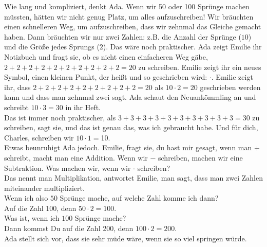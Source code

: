 Wie lang und kompliziert, denkt Ada. 
Wenn wir 50 oder 100 Sprünge machen müssten, hätten wir nicht genug Platz, um alles aufzuschreiben! 
Wir bräuchten einen schnelleren Weg, um aufzuschreiben, dass wir zehnmal das Gleiche gemacht haben. Dann bräuchten wir nur zwei Zahlen: z.B. die Anzahl der Sprünge ($10$) und die Größe jedes Sprungs ($2$). Das wäre noch praktischer. 
Ada zeigt Emilie ihr Notizbuch und fragt sie, ob es nicht einen einfacheren Weg gäbe, $2+2+2+2+2+2+2+2+2+2=20$ zu schreiben. Emilie zeigt ihr ein neues Symbol, einen kleinen Punkt, der  heißt und so geschrieben wird: $\cdot$. Emilie zeigt ihr, dass $2+2+2+2+2+2+2+2+2=20$ als $10 \cdot 2 = 20$ geschrieben werden kann und dass man zehnmal zwei sagt.
Ada schaut den Neuankömmling an und schreibt $10 \cdot 3 = 30 $ in ihr Heft. 
\\
\frqq{}Das ist immer noch praktischer, als $3+3+3+3+3+3+3+3+3+3=30$ zu schreiben\flqq{}, sagt sie, \frqq{}und das ist genau das, was ich gebraucht habe. Und für dich, Charles, schreiben wir $10 \cdot 1 = $10.\flqq{}\\
Etwas beunruhigt Ada jedoch. 
\frqq{}Emilie\flqq{}, fragt sie, \frqq{}du hast mir gesagt, wenn man $+$ schreibt, macht man eine Addition. Wenn wir $-$ schreiben, machen wir eine Subtraktion. Was machen wir, wenn wir $\cdot$ schreiben?\\
\frqq{}Das nennt man Multiplikation\flqq{}, antwortet Emilie, \frqq{}man sagt, dass man zwei Zahlen miteinander multipliziert.\\
\frqq{}Wenn ich also $50$ Sprünge mache, auf welche Zahl komme ich dann?\flqq{}\\
\frqq{}Auf die Zahl 100, denn $50 \cdot 2 = 100$.\flqq{}\\
\frqq{}Was ist, wenn ich $100$ Sprünge mache?\flqq{}\\
\frqq{}Dann kommst Du auf die Zahl 200, denn $100 \cdot 2 = 200$.\flqq{}\\
Ada stellt sich vor, dass sie sehr müde wäre, wenn sie so viel springen würde.
